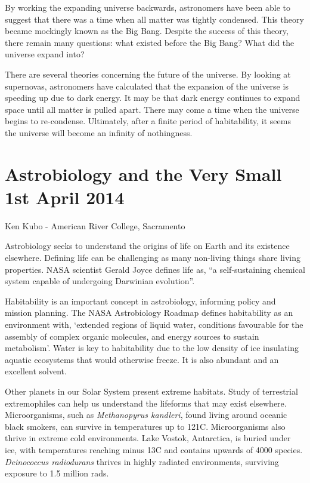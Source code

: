 \documentclass{article}
\begin{document}
\noindent By working the expanding universe backwards, astronomers have been able to suggest that there was a time when all matter was tightly condensed. This theory became mockingly known as the Big Bang. Despite the success of this theory, there remain many questions: what existed before the Big Bang? What did the universe expand into? \bigskip

\noindent There are several theories concerning the future of the universe. By looking at supernovas, astronomers have calculated that the expansion of the universe is speeding up due to dark energy. It may be that dark energy continues to expand space until all matter is pulled apart. There may come a time when the universe begins to re-condense. Ultimately, after a finite period of habitability, it seems the universe will become an infinity of nothingness.

\section{Astrobiology and the Very Small 1st April 2014}

Ken Kubo - American River College, Sacramento \bigskip

\noindent Astrobiology seeks to understand the origins of life on Earth and its existence elsewhere. Defining life can be challenging as many non-living things share living properties. NASA scientist Gerald Joyce defines life as, “a self-sustaining chemical system capable of undergoing Darwinian evolution”. \bigskip

\noindent Habitability is an important concept in astrobiology, informing policy and mission planning. The NASA Astrobiology Roadmap defines habitability as an environment with, ‘extended regions of liquid water, conditions favourable for the assembly of complex organic molecules, and energy sources to sustain metabolism’. Water is key to habitability due to the low density of ice insulating aquatic ecosystems that would otherwise freeze. It is also abundant and an excellent solvent. \bigskip

\noindent Other planets in our Solar System present extreme habitats. Study of terrestrial extremophiles can help us understand the lifeforms that may exist elsewhere. Microorganisms, such as \textit{Methanopyrus kandleri}, found living around oceanic black smokers, can survive in temperatures up to 121\textdegree C. Microorganisms also thrive in extreme cold environments. Lake Vostok, Antarctica, is buried under ice, with temperatures reaching minus 13\textdegree C and contains upwards of 4000 species. \textit{Deinococcus radiodurans} thrives in highly radiated environments, surviving exposure to 1.5 million rads. \bigskip
\end{document}
